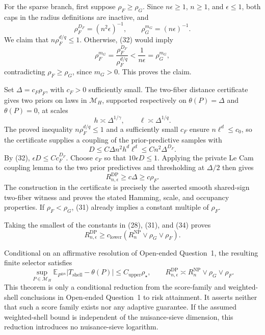 For the sparse branch, first suppose \(\rho_F\ge\rho_G\).  Since \(n\epsilon\ge1\), \(n\ge1\), and \(\epsilon\le1\), both caps in the radius definitions are inactive, and
\[
 \rho_F^{D_F}=(n^2\epsilon)^{-1},
 \qquad \rho_G^{m_G}=(n\epsilon)^{-1}.
 \tag{32}
\]
We claim that \(n\rho_F^{d/q}\le1\).  Otherwise, (32) would imply
\[
 \rho_F^{m_G}
 =\frac{\rho_F^{D_F}}{\rho_F^{d/q}}
 <\frac1{n\epsilon}
 =\rho_G^{m_G},
\]
contradicting \(\rho_F\ge\rho_G\), since \(m_G>0\).  This proves the claim.

Set \(\Delta=c_F\rho_F\), with \(c_F>0\) sufficiently small.  The two-fiber distance certificate gives two priors on laws in \(\mathcal M_H\), supported respectively on \(\theta(P)=\Delta\) and \(\theta(P)=0\), at scales
\[
 h\asymp\Delta^{1/\gamma},\qquad
 \ell\asymp\Delta^{1/q}.
\]
The proved inequality \(n\rho_F^{d/q}\le1\) and a sufficiently small \(c_F\) ensure \(n\ell^d\le c_0\), so the certificate supplies a coupling of the prior-predictive samples with
\[
 D\le C\Delta n^2h^d\ell^d
 \le Cn^2\Delta^{D_F}.
 \tag{33}
\]
By (32), \(\epsilon D\le Cc_F^{D_F}\).  Choose \(c_F\) so that \(10\epsilon D\le1\).  Applying the private Le Cam coupling lemma to the two prior predictives and thresholding at \(\Delta/2\) then gives
\[
 R_{n,\epsilon}^{\mathrm{DP}}\ge c\Delta\ge c\rho_F.
 \tag{34}
\]
The construction in the certificate is precisely the asserted smooth shared-sign two-fiber witness and proves the stated Hamming, scale, and occupancy properties.  If \(\rho_F<\rho_G\), (31) already implies a constant multiple of \(\rho_F\).

Taking the smallest of the constants in (28), (31), and (34) proves
\[
 R_{n,\epsilon}^{\mathrm{DP}}
 \ge c_{\mathrm{lower}}\left(R_n^{\mathrm{NP}}\vee\rho_G\vee\rho_F\right).
\]

Conditional on an affirmative resolution of Open-ended Question~1, the resulting finite selector satisfies
\[
 \sup_{P\in\mathcal M_H}\mathbb E_{P^{\otimes n}}
 |T_{\mathrm{shell}}-\theta(P)|
 \le C_{\mathrm{upper}}\rho_\star,
 \qquad
 R_{n,\epsilon}^{\mathrm{DP}}
 \asymp R_n^{\mathrm{NP}}\vee\rho_G\vee\rho_F.
\]
This theorem is only a conditional reduction from the score-family and weighted-shell conclusions in Open-ended Question~1 to risk attainment.  It asserts neither that such a score family exists nor any adaptive guarantee.  If the assumed weighted-shell bound is independent of the nuisance-sieve dimension, this reduction introduces no nuisance-sieve logarithm.


